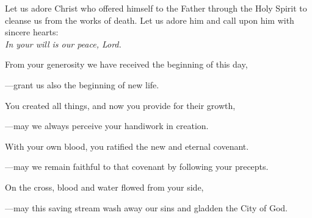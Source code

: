 \intercessions\indent

\begin{hangpar}

Let us adore Christ who offered himself to the Father through the Holy Spirit to cleanse us from the works of death. Let us adore him and call upon him with sincere hearts:\\
\emph{In your will is our peace, Lord.}

\medskip From your generosity we have received the beginning of this day,

{\color{red}---\thinspace}grant us also the beginning of new life.

\medskip You created all things, and now you provide for their growth,

{\color{red}---\thinspace}may we always perceive your handiwork in creation.

\medskip With your own blood, you ratified the new and eternal covenant.

{\color{red}---\thinspace}may we remain faithful to that covenant by following your precepts.

\medskip On the cross, blood and water flowed from your side,

{\color{red}---\thinspace}may this saving stream wash away our sins and gladden the City of God.

\end{hangpar}

